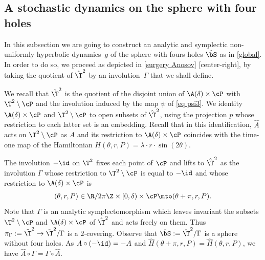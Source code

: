 \subsection{A stochastic dynamics on the sphere with four holes}\label{S32}
In this subsection we are going to construct
an analytic and symplectic non-uniformly hyperbolic dyna\-mics~$g$ of the sphere with fours holes $\hat \bS$ as in \cref{global}. In order to do so, we proceed as depicted in \cref{surgery Anosov} [center-right], by taking the quotient of $\hat \T^2$ by an involution~$\Gamma$ that we shall define.

We recall that $\hat \T^2$ is the quotient of the disjoint union of
$\A(\delta)\times \cP $ with $\T^2\setminus \cP$ and the involution induced by the map $\psi$ of \cref{eq psi3}.
We identity $\A(\delta)\times \cP $ and $\T^2\setminus \cP$ to open subsets of $\hat \T^2$, using the projection $p$ whose restriction to each latter set is an embedding.
Recall that in this identification, $\hat A$ acts on $\T^2\setminus \cP$ as $A$ and its restriction to $\A(\delta)\times \cP $ coincides with the time-one map of the Hamiltonian $H(\theta, r, P)= \lambda\cdot r \cdot \sin(2\theta)$.

The involution $-\id$ on $\T^2$ fixes each point of $\cP$ and lifts to $\hat \T^2$ as the involution $\Gamma$ whose restriction to $\T^2\setminus \cP$ is equal to $-\id $ and whose restriction to $ \A(\delta)\times \cP $ is
\[(\theta,r,P)\in \R/2\pi \Z \times [0,\delta)\times
\cP \mto (\theta+\pi,r,P).
\]
Note that $\Gamma$ is an analytic symplectomorphism which leaves invariant the subsets $\T^2\setminus \cP$ and
$ \A(\delta)\times \cP $ of $\hat \T^2$ and
acts freely on them. Thus $\pi_\Gamma:= \hat \T^2\to \hat \T^2/\Gamma$ is a $2$-covering.
Observe that $\hat \bS:=\hat \T^2/\Gamma$ is a sphere without four holes.
As $A\circ (-\id)=-A$ and $\widehat H(\theta+\pi,r,P)=\widehat H(\theta,r,P)$, we have $\hat A\circ \Gamma=\Gamma\circ \hat A$.

